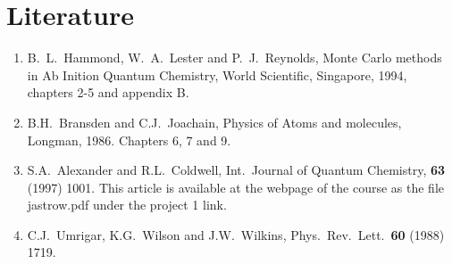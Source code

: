 \documentclass[10pt]{article}
\begin{document}
\section*{Literature}
\begin{enumerate}
\item B.~L.~Hammond, W.~A.~Lester and P.~J.~Reynolds, Monte Carlo methods
in Ab Inition Quantum Chemistry, World Scientific, Singapore, 1994, chapters
2-5 and appendix B.

\item B.H.~Bransden and C.J.~Joachain, Physics of Atoms and molecules,
Longman, 1986. Chapters 6, 7 and 9.
\item S.A.~Alexander and R.L.~Coldwell,
Int.~Journal of Quantum Chemistry, {\bf 63} (1997) 1001.  This article is available 
at the webpage of the course as the file jastrow.pdf under the project 1 link.
\item C.J.~Umrigar, K.G.~Wilson and J.W.~Wilkins, Phys.~Rev.~Lett.~{\bf 60}
(1988) 1719. 



\end{enumerate}
\end{document}

